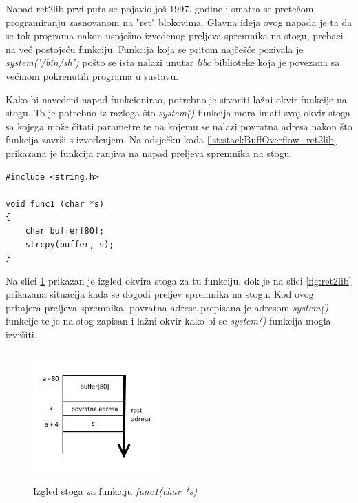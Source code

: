 \documentclass[times, utf8, diplomski, numeric]{fer}
\begin{document}
Napad ret2lib prvi puta se pojavio još 1997. godine
\citep{ret2lib_official} i smatra se pretečom programiranju
zasnovanom na "ret" blokovima. Glavna ideja ovog napada je ta da
se tok programa nakon uspješno izvedenog preljeva spremnika na
stogu, prebaci na već postojeću funkciju. Funkcija koja se pritom
najčešće pozivala je \emph{system('/bin/sh')} pošto se ista
nalazi unutar \emph{libc} biblioteke koja je povezana sa većinom
pokrenutih programa u sustavu.

Kako bi navedeni napad funkcionirao, potrebno je stvoriti lažni
okvir funkcije na stogu. To je potrebno iz razloga što
\emph{system()} funkcija mora imati svoj okvir stoga sa kojega
može čitati parametre te na kojemu se nalazi povratna adresa
nakon što funkcija završi s izvođenjem. Na odsječku koda
\ref{lst:stackBuffOverflow_ret2lib} prikazana je funkcija ranjiva
na napad preljeva spremnika na stogu.

\begin{lstlisting}[frame=single, caption=Primjer preljeva spremnika na stogu, label={lst:stackBuffOverflow_ret2lib}]
#include <string.h>
 
void func1 (char *s)
{
	char buffer[80];
	strcpy(buffer, s);
}

\end{lstlisting}

Na slici \ref{fig:ret2lib_stackFrame} prikazan je izgled okvira
stoga za tu funkciju, dok je na slici \ref{fig:ret2lib} prikazana
situacija kada se dogodi preljev spremnika na stogu. Kod ovog
primjera preljeva spremnika, povratna adresa prepisana je adresom
\emph{system()} funkcije te je na stog zapisan i lažni okvir kako
bi se \emph{system()} funkcija mogla izvršiti.  

\pagebreak

\begin{figure}[!htb]
\centering
\setlength\fboxsep{0pt}
\setlength\fboxrule{0.5pt}
\includegraphics[width=5cm, height=5cm]{slike/ret2lib_stackFrame}
\caption{Izgled stoga za funkciju \emph{func1(char *s)}}
\label{fig:ret2lib_stackFrame} 
\end{figure}
\end{document}
